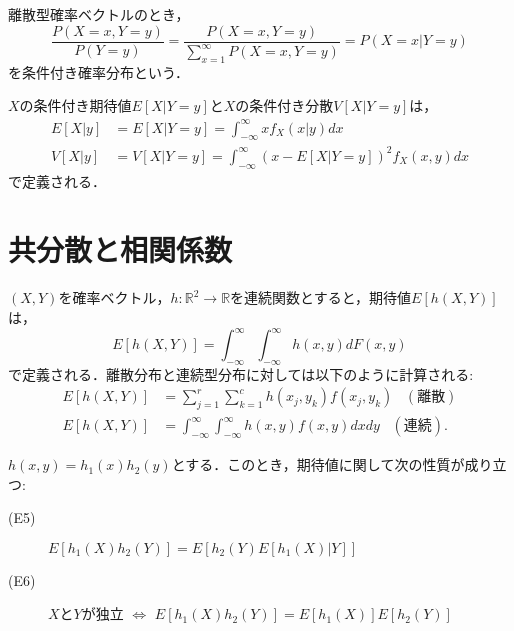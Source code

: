 \documentclass{jsreport}
\begin{document}
離散型確率ベクトルのとき，
\begin{equation}
  \frac{P(X = x, Y = y)}{P(Y = y)} = \frac{P(X = x, Y = y)}{\sum_{x = 1}^{\infty} P(X = x, Y = y)} = P(X = x | Y = y) \nonumber
\end{equation}
を条件付き確率分布という．

$X$の条件付き期待値$E[X | Y = y]$と$X$の条件付き分散$V[X | Y = y]$は，
\begin{align}
  E[X | y] &= E[X | Y = y] = \int_{-\infty}^{\infty} x f_{X} (x | y) dx \nonumber \\
  V[X | y] &= V[X | Y = y] = \int_{-\infty}^{\infty} (x - E[X | Y = y])^2 f_{X}(x, y) dx \nonumber
\end{align}
で定義される．

\section{共分散と相関係数}
$(X, Y)$を確率ベクトル，$h: \mathbb{R}^2 \rightarrow \mathbb{R}$を連続関数とすると，期待値$E[h(X, Y)]$は，
\begin{equation}
  E[h(X, Y)] = \int_{-\infty}^{\infty} \int_{-\infty}^{\infty} h(x, y) dF(x, y) \nonumber
\end{equation}
で定義される．離散分布と連続型分布に対しては以下のように計算される:
\begin{align}
  E[h(X, Y)] &= \sum_{j = 1}^r \sum_{k = 1}^c h(x_j, y_k) f(x_j, y_k) \; \; \; (離散) \nonumber \\
  E[h(X, Y)] &= \int_{-\infty}^{\infty} \int_{-\infty}^{\infty} h(x, y) f(x, y) dx dy \; \; \; (連続). \nonumber
\end{align}

$h(x, y) = h_1(x)h_2(y)$とする．このとき，期待値に関して次の性質が成り立つ:
\begin{description}
  \item[(E5)] $E[h_1(X)h_2(Y)] = E[h_2(Y)E[h_1(X)|Y]]$
  \item[(E6)] $X$と$Y$が独立 $\Longleftrightarrow$ $E[h_1(X)h_2(Y)] = E[h_1(X)]E[h_2(Y)]$
\end{description}
\end{document}
